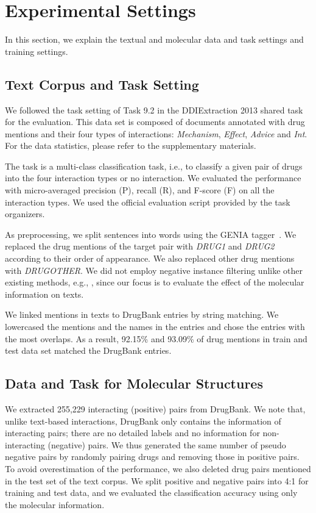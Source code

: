 \documentclass[11pt,a4paper]{article}
\begin{document}
\section{Experimental Settings}
In this section, we explain the textual and molecular data and task settings and training settings.

\subsection{Text Corpus and Task Setting}



We followed the task setting of Task 9.2 in the DDIExtraction 2013 shared task~\cite{segura2013semeval,herrero2013ddi} for the evaluation. 
This data set is composed of documents annotated with drug mentions and their four types of interactions: \textsl{Mechanism}, \textsl{Effect}, \textsl{Advice} and \textsl{Int}. For the data statistics, please refer to the supplementary materials.



The task is a multi-class classification task, i.e., to classify a given pair of drugs into the four interaction types or no interaction. 
We evaluated the performance with micro-averaged precision (P), recall (R), and F-score (F) on all the interaction types. We used the official evaluation script provided by the task organizers.

As preprocessing, we split sentences into words using the GENIA tagger~\cite{geniatagger}. 
We replaced the drug mentions of the target pair with \textsl{DRUG1} and \textsl{DRUG2} according to their order of appearance.   
We also replaced other drug mentions with \textsl{DRUGOTHER}.
We did not employ negative instance filtering unlike other existing methods, e.g., \citet{liu2016drug}, since our focus is to evaluate the effect of the molecular information on texts.

We linked mentions in texts to DrugBank entries by string matching. We lowercased the mentions and the names in the entries and chose the entries with the most overlaps. 
As a result, 92.15\% and 93.09\% of drug mentions in train and test data set matched the DrugBank entries. 


\subsection{Data and Task for Molecular Structures}
We extracted 255,229 interacting (positive) pairs from DrugBank. 
We note that, unlike text-based interactions, DrugBank only contains the information of interacting pairs; 
there are no detailed labels and no information for non-interacting (negative) pairs.
We thus generated the same number of pseudo negative pairs by randomly pairing drugs and removing those in positive pairs. 
To avoid overestimation of the performance, we also deleted drug pairs mentioned in the test set of the text corpus.
We split positive and negative pairs into 4:1 for training and test data, and we evaluated the classification accuracy using only the molecular information. 
\end{document}
